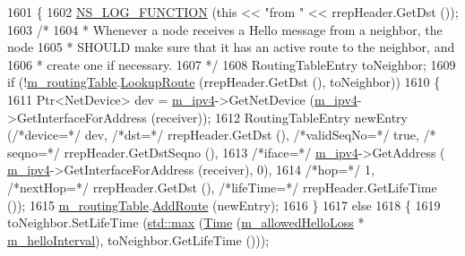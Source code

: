 \begin{DoxyCode}
1601 \{
1602   \hyperlink{log-macros-disabled_8h_a90b90d5bad1f39cb1b64923ea94c0761}{NS\_LOG\_FUNCTION} (\textcolor{keyword}{this} << \textcolor{stringliteral}{"from "} << rrepHeader.GetDst ());
1603   \textcolor{comment}{/*}
1604 \textcolor{comment}{   *  Whenever a node receives a Hello message from a neighbor, the node}
1605 \textcolor{comment}{   * SHOULD make sure that it has an active route to the neighbor, and}
1606 \textcolor{comment}{   * create one if necessary.}
1607 \textcolor{comment}{   */}
1608   RoutingTableEntry toNeighbor;
1609   \textcolor{keywordflow}{if} (!\hyperlink{classns3_1_1aodv_1_1RoutingProtocol_a4e1003a34c8adc96db71096d88c98ae0}{m\_routingTable}.\hyperlink{classns3_1_1aodv_1_1RoutingTable_a90cbc8a2c65cd68ccdaf768fcbb5d723}{LookupRoute} (rrepHeader.GetDst (), toNeighbor))
1610     \{
1611       Ptr<NetDevice> dev = \hyperlink{classns3_1_1aodv_1_1RoutingProtocol_aee33006b1f9d8b24d4722037ff3fec98}{m\_ipv4}->GetNetDevice (\hyperlink{classns3_1_1aodv_1_1RoutingProtocol_aee33006b1f9d8b24d4722037ff3fec98}{m\_ipv4}->GetInterfaceForAddress (receiver));
1612       RoutingTableEntry newEntry (\textcolor{comment}{/*device=*/} dev, \textcolor{comment}{/*dst=*/} rrepHeader.GetDst (), \textcolor{comment}{/*validSeqNo=*/} \textcolor{keyword}{true}, \textcolor{comment}{/*
      seqno=*/} rrepHeader.GetDstSeqno (),
1613                                               \textcolor{comment}{/*iface=*/} \hyperlink{classns3_1_1aodv_1_1RoutingProtocol_aee33006b1f9d8b24d4722037ff3fec98}{m\_ipv4}->GetAddress (
      \hyperlink{classns3_1_1aodv_1_1RoutingProtocol_aee33006b1f9d8b24d4722037ff3fec98}{m\_ipv4}->GetInterfaceForAddress (receiver), 0),
1614                                               \textcolor{comment}{/*hop=*/} 1, \textcolor{comment}{/*nextHop=*/} rrepHeader.GetDst (), \textcolor{comment}{/*lifeTime=*/} 
      rrepHeader.GetLifeTime ());
1615       \hyperlink{classns3_1_1aodv_1_1RoutingProtocol_a4e1003a34c8adc96db71096d88c98ae0}{m\_routingTable}.\hyperlink{classns3_1_1aodv_1_1RoutingTable_a579e562e38e67d510de1ff2c87806c76}{AddRoute} (newEntry);
1616     \}
1617   \textcolor{keywordflow}{else}
1618     \{
1619       toNeighbor.SetLifeTime (\hyperlink{80211b_8c_affe776513b24d84b39af8ab0930fef7f}{std::max} (\hyperlink{namespacens3_1_1TracedValueCallback_a7ffd3e7c142ffe7c8a1d2db9b8de38ec}{Time} (\hyperlink{classns3_1_1aodv_1_1RoutingProtocol_a80e1dc9b9a640570ba5d5270846a2f6f}{m\_allowedHelloLoss} * 
      \hyperlink{classns3_1_1aodv_1_1RoutingProtocol_aa9750612eb154b537b1d7d0350cb8912}{m\_helloInterval}), toNeighbor.GetLifeTime ()));

\end{DoxyCode}
